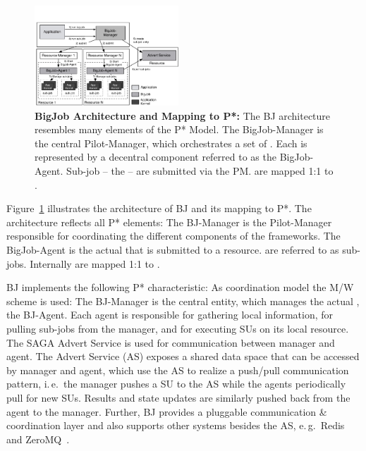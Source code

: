 \documentclass[conference]{IEEEtran}
\begin{document}

\begin{figure}[t]
	\up\upp
	\centering
	\includegraphics[width=0.48\textwidth]{../figures/re_bigjob_interactions.pdf}
	\caption{\textbf{BigJob Architecture and Mapping to P*:} The
          BJ architecture resembles many elements of the P* Model. The
          BigJob-Manager is the central Pilot-Manager, which
          orchestrates a set of \pilots. Each \pilot is represented by a
          decentral component referred to as the BigJob-Agent. Sub-job
          -- the \cus -- are submitted via the PM. \cus are mapped 1:1
          to \sus. %
        }
	\label{fig:figures_re_bigjob_interactions}
\end{figure}


Figure~\ref{fig:figures_re_bigjob_interactions} illustrates the
architecture of BJ and its mapping to P*. The architecture reflects
all P* elements: The BJ-Manager is the Pilot-Manager responsible for
coordinating the different components of the frameworks. The
BigJob-Agent is the actual \pilot that is submitted to a
resource. \cus are referred to as sub-jobs. Internally \cus are mapped
1:1 to \sus.

BJ implements the following P* characteristic: As coordination model the 
M/W scheme is used: The BJ-Manager is the central entity, which manages the
actual \pilot, the BJ-Agent. Each agent is responsible for gathering local
information, for pulling sub-jobs from the manager, and for executing SUs on its
local resource. The SAGA Advert Service is used for communication between
manager and agent. The Advert Service (AS) exposes a shared data space that can
be accessed by manager and agent, which use the AS to realize a push/pull
communication pattern, i.\,e.\ the manager pushes a SU to the AS while the
agents periodically pull for new SUs. Results and state updates are similarly
pushed back from the agent to the manager. Further, BJ provides a pluggable
communication \& coordination layer and also supports other \cc systems besides 
the AS, e.\,g.\ Redis~\cite{redis} and ZeroMQ~\cite{zmq}.
\end{document}
